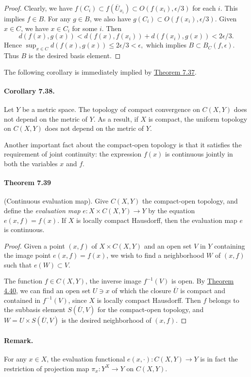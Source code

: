 \documentclass{article}
\numberwithin{equation}{section}
\theoremstyle{plain}
\theoremstyle{definition}
\begin{document}
\begin{proof}
Clearly, we have $f(C_i)\subset f(\overline{U}_{x_i})\subset O(f(x_i),\epsilon/3)$ for each $i$. This implies $f\in B$. For any $g\in B$, we also have $g(C_i)\subset O(f(x_i),\epsilon/3)$. Given $x\in C$, we have $x\in C_i$ for some $i$. Then
$$d(f(x),g(x)) < d(f(x),f(x_i)) + d(f(x_i),g(x)) < 2\epsilon/3.$$ 
Hence $\sup_{x\in C} d(f(x),g(x))\leq 2\epsilon/3 < \epsilon,$ which implies $B\subset B_C(f,\epsilon)$.
Thus $B$ is the desired basis element.
\end{proof}

The following corollary is immediately implied by \hyperref[thm:7.37]{Theorem 7.37}.
\paragraph{Corollary 7.38.\label{cor:7.38}} Let $Y$ be a metric space. The topology of compact convergence on $C(X,Y)$ does not depend on the metric of $Y$. As a result, if $X$ is compact, the uniform
topology on $C(X,Y)$ does not depend on the metric of $Y$.

Another important fact about the compact-open topology is that it satisfies the requirement of joint continuity: the expression $f(x)$ is continuous jointly in both the variables $x$ and $f$.

\paragraph{Theorem 7.39\label{thm:7.39}} (Continuous evaluation map). Give $C(X,Y)$ the compact-open topology, and define the \textit{evaluation map} $e:X\times C(X,Y)\to Y$ by the equation $e(x,f)=f(x)$. If $X$ is locally compact Hausdorff, then the evaluation map $e$ is continuous.
\begin{proof}
Given a point $(x,f)$ of $X\times C(X,Y)$ and an open set $V$ in $Y$ containing the image point $e(x,f)=f(x)$, we wish to find a neighborhood $W$ of $(x,f)$ such that $e(W)\subset V$.

The function $f\in C(X,Y)$, the inverse image $f^{-1}(V)$ is open. By \hyperref[thm:4.40]{Theorem 4.40}, we can find an open set $U\ni x$ of which the closure $\overline{U}$ is compact and contained in $f^{-1}(V)$, since $X$ is locally compact Hausdorff. Then $f$ belongs to the subbasis element $S(\overline{U},V)$ for the compact-open topology, and $W=U\times S(\overline{U},V)$ is the desired neighborhood of $(x,f)$.
\end{proof}

\paragraph{Remark.} For any $x\in X$, the evaluation functional $e(x,\cdot):C(X,Y)\to Y$ is in fact the restriction of projection map $\pi_x:Y^X\to Y$ on $C(X,Y)$.
\end{document}
